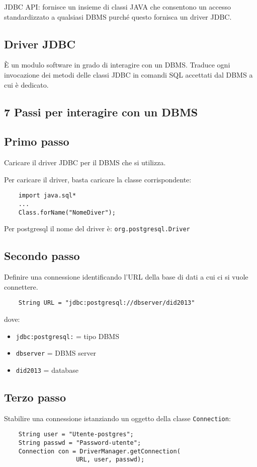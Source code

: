 \documentclass[a4paper, 10pt]{article}
\theoremstyle{definition}
\begin{document}
			\noindent
			JDBC API: fornisce un insieme di classi JAVA che
			consentono un accesso standardizzato a qualsiasi
			DBMS purché questo fornisca un driver JDBC.
		\subsection*{Driver JDBC}
			È un modulo software in grado di interagire con un
			DBMS. Traduce ogni invocazione dei metodi delle
			classi JDBC in comandi SQL accettati dal DBMS a
			cui è dedicato.
		\subsection{7 Passi per interagire con un DBMS}
			\subsection*{Primo passo}
				Caricare il driver JDBC per il DBMS che si utilizza.

				Per caricare il driver, basta caricare la classe
				corrispondente:
				\begin{lstlisting}
	import java.sql*
	...
	Class.forName("NomeDiver");
				\end{lstlisting}
				
				\noindent
				Per postgresql il nome del driver è: \lstinline|org.postgresql.Driver|
				
			\subsection*{Secondo passo}
				Definire una connessione identificando l'URL della base
				di dati a cui ci si vuole connettere.
				\begin{lstlisting}
	String URL = "jdbc:postgresql://dbserver/did2013"
				\end{lstlisting}
				dove:
				\begin{itemize}
					\item \lstinline|jdbc:postgresql:| = tipo DBMS
					\item \lstinline|dbserver| = DBMS server
					\item \lstinline|did2013| = database
				\end{itemize}
				
			\subsection*{Terzo passo}
				Stabilire una connessione istanziando un oggetto
				della classe \lstinline|Connection|:
				\begin{lstlisting}
	String user = "Utente-postgres";
	String passwd = "Password-utente";
	Connection con = DriverManager.getConnection(
					URL, user, passwd);
				\end{lstlisting}
				
\end{document}
